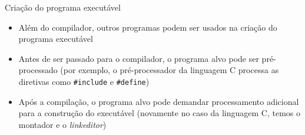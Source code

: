 \begin{frame}[fragile]{Criação do programa executável}

    \begin{itemize}
        \item Além do compilador, outros programas podem ser usados na criação do programa executável
        \pause

        \item Antes de ser passado para o compilador, o programa alvo pode ser pré-processado (por exemplo, o pré-processador da linguagem C processa as
            diretivas como \texttt{#include} e \texttt{#define})
        \pause

        \item Após a compilação, o programa alvo pode demandar processamento adicional para a construção do executável (novamente no caso da linguagem C, temos
            o montador e o \textit{linkeditor})

    \end{itemize}

\end{frame}

